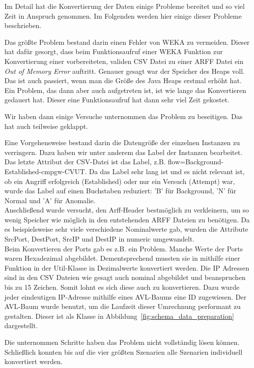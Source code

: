 \documentclass[main.tex]{subfiles}
\begin{document}
Im Detail hat die Konvertierung der Daten einige Probleme bereitet und so viel
Zeit in Anspruch genommen.
Im Folgenden werden hier einige dieser Probleme beschrieben.

Das größte Problem bestand darin einen Fehler von WEKA zu vermeiden. Dieser hat
dafür gesorgt, dass beim Funktionsaufruf einer WEKA Funktion zur Konvertierung
einer vorbereiteten, validen CSV Datei zu einer ARFF Datei ein \textit{Out of Memory Error} auftritt.
Genauer gesagt war der Speicher des Heaps voll. Das ist auch passiert, wenn man
die Größe des Java Heaps erstmal erhöht hat. Ein Problem, das dann aber auch
aufgetreten ist, ist wie lange das Konvertieren gedauert hat.
Dieser eine Funktionsaufruf hat dann sehr viel Zeit gekostet.

Wir haben dann einige Versuche unternommen das Problem zu beseitigen.
Das hat auch teilweise geklappt.

Eine Vorgehensweise bestand darin die Datengröße der einzelnen Instanzen zu
verringern.
Dazu haben wir unter anderem das Label der Instanzen bearbeitet.
Das letzte Attribut der CSV-Datei ist das Label, z.B. flow=Background-Established-cmpgw-CVUT.
Da das Label sehr lang ist und es nicht relevant ist, ob ein Angriff erfolgreich (Established) oder nur ein Versuch (Attempt) war, wurde das Label auf einen Buchstaben reduziert: 'B' für Background, 'N' für Normal und 'A' für Anomalie.\\

Anschließend wurde versucht, den Arff-Header bestmöglich zu verkleinern, um so
wenig Speicher wie möglich in den entstehenden ARFF Dateien zu benötigen.
Da es beispielsweise sehr viele verschiedene Nominalwerte gab, wurden die Attribute SrcPort, DestPort, SrcIP und DestIP in numeric umgewandelt. \\
Beim Konvertieren der Ports gab es z.B. ein Problem.
Manche Werte der Ports waren Hexadezimal abgebildet. Dementsprechend mussten sie in mithilfe einer Funktion in der Util-Klasse in Dezimalwerte konvertiert werden.
Die IP Adressen sind in den CSV Dateien wie gesagt auch nominal abgebildet und
beanspruchen bis zu 15 Zeichen.
Somit lohnt es sich diese auch zu konvertieren.
Dazu wurde jeder eindeutigen IP-Adresse mithilfe eines AVL-Baums eine ID zugewiesen.
Der AVL-Baum wurde benutzt, um die Laufzeit dieser Umrechnung performant zu
gestalten.
Dieser ist als Klasse in Abbildung~\ref{fig:schema_data_preparation}
dargestellt.

Die unternommen Schritte haben das Problem nicht vollständig lösen können.
Schließlich konnten bis auf die vier größten Szenarien alle Szenarien individuell konvertiert werden.
\end{document}

